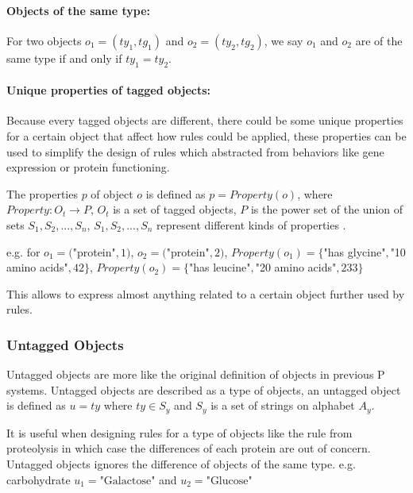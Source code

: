\documentclass[9pt,a4paper,twoside]{article}
\begin{document}
\paragraph{Objects of the same type:}
            
                For two objects $o_1 = (ty_1, tg_1)$ and $o_2 = (ty_2, tg_2)$, we say $o_1$ and $o_2$ are of the same type if and only if 
                $ty_1 = ty_2$.
\paragraph{Unique properties of tagged objects:}
            
                Because every tagged objects are different, there could be some unique properties for a certain object that affect how rules could be 
                applied, these properties can be used to simplify the design of rules which abstracted from behaviors like gene expression or protein functioning.
                
                The properties $p$ of object $o$ is defined as $p = Property(o)$, where $Property: O_t \rightarrow P$, $O_t$ is a set of tagged objects,
                $P$ is the power set of the union of sets $S_1, S_2,...,S_n$, $S_1, S_2,...,S_n$ represent different kinds of properties .
                
                e.g. for
                $o_1 = ($"protein"$, 1)$,
                $o_2 = ($"protein"$, 2)$,
                $Property(o_1) = \{$"has glycine"$,$"10 amino acids"$,42\}$,
                $Property(o_2) = \{$"has leucine"$,$"20 amino acids"$,233\}$
                
                This allows to express almost anything related to a certain object further used by rules.
                
\subsubsection{Untagged Objects}
        
            Untagged objects are more like the original definition of objects in previous P systems.
            Untagged objects are described as a type of objects, an untagged object is defined as $u = ty$ where $ty \in S_y$ and $S_y$ is a set of strings on alphabet $A_y$. 
            
            It is useful when designing rules for a type of objects like the rule from proteolysis in which case the differences of each protein are out of concern.
            Untagged objects ignores the difference of objects of the same type. e.g. carbohydrate $u_1 = \text{"Galactose"}$ and $u_2 = \text{"Glucose"} $
\end{document}
